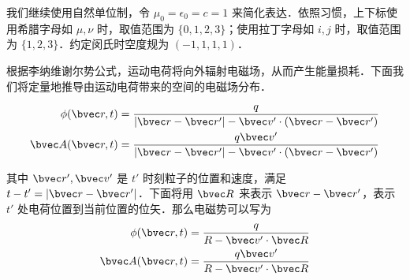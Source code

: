 

我们继续使用自然单位制，令 $\mu_0=\epsilon_0=c=1$ 来简化表达．依照习惯，上下标使用希腊字母如 $\mu, \nu$ 时，取值范围为 $\{0, 1, 2, 3\}$；使用拉丁字母如 $i, j$ 时，取值范围为 $\{1, 2, 3\}$．约定闵氏时空度规为 $(-1,1,1,1)$．

根据李纳维谢尔势公式，运动电荷将向外辐射电磁场，从而产生能量损耗．下面我们将定量地推导由运动电荷带来的空间的电磁场分布．

\begin{equation}
\begin{aligned}
\phi(\bvec r,t)=\frac{q}{|\bvec r-\bvec r'|-\bvec v'\cdot (\bvec r-\bvec r')}\\
\bvec A(\bvec r,t)=\frac{q\bvec v'}{|\bvec r-\bvec r'|-\bvec v'\cdot (\bvec r-\bvec r')}
\end{aligned}
\end{equation}

其中 $\bvec r',\bvec v'$ 是 $t'$ 时刻粒子的位置和速度，满足 $t-t'=|\bvec r-\bvec r'|$．下面将用 $\bvec R$ 来表示 $\bvec r-\bvec r'$，表示 $t'$ 处电荷位置到当前位置的位矢．那么电磁势可以写为
\begin{equation}
\begin{aligned}
\phi(\bvec r,t)=\frac{q}{R-\bvec v'\cdot \bvec R}\\
\bvec A(\bvec r,t)=\frac{q\bvec v'}{R-\bvec v'\cdot \bvec R}
\end{aligned}
\end{equation}

